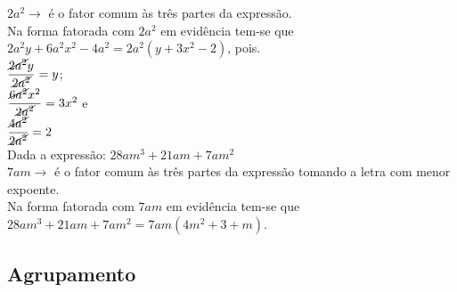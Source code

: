 $ 2a^{2} \longrightarrow $  é o fator comum às três partes da expressão.\\

Na forma fatorada com $ 2a^{2} $ em evidência tem-se que \\

$ 2a^{2}y + 6a^{2}x^{2} - 4a^{2} = 2a^{2}(y + 3x^{2} - 2) $, pois. \\

$ \dfrac{\cancel{2a^{2}}y}{\cancel{2a^{2}}} = y $; \\

$ \dfrac{\cancel{6a^{2}}x^{2}}{\cancel{2a^{2}}} = 3x^{2} $ e \\

$ \dfrac{\cancel{4a^{2}}}{\cancel{2a^{2}}} = 2 $ \\

Dada a expressão: $ 28am^{3} + 21am + 7am^{2} $\\

$ 7am \longrightarrow $  é o fator comum às três partes da expressão tomando a letra com menor expoente.\\

Na forma fatorada com $ 7am $ em evidência tem-se que \\

$ 28am^{3} + 21am + 7am^{2} = 7am(4m^{2} + 3 + m) $. \\

\subsection{Agrupamento}

